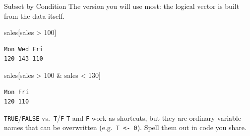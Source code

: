 \documentclass[
  ignorenonframetext,
  aspectratio=169,
]{beamer}
\newenvironment{Shaded}{\begin{snugshade}}{\end{snugshade}}
\newcommand{\DecValTok}[1]{\textcolor[rgb]{0.68,0.00,0.00}{#1}}
\newcommand{\NormalTok}[1]{\textcolor[rgb]{0.00,0.23,0.31}{#1}}
\newcommand{\SpecialCharTok}[1]{\textcolor[rgb]{0.37,0.37,0.37}{#1}}
\begin{document}
\begin{frame}[fragile]{Subset by Condition}
\protect\hypertarget{subset-by-condition}{}
The version you will use most: the logical vector is built from the data
itself.

\begin{Shaded}
\begin{Highlighting}[]
\NormalTok{sales[sales }\SpecialCharTok{\textgreater{}} \DecValTok{100}\NormalTok{]}
\end{Highlighting}
\end{Shaded}

\begin{verbatim}
Mon Wed Fri 
120 143 110 
\end{verbatim}

\begin{Shaded}
\begin{Highlighting}[]
\NormalTok{sales[sales }\SpecialCharTok{\textgreater{}} \DecValTok{100} \SpecialCharTok{\&}\NormalTok{ sales }\SpecialCharTok{\textless{}} \DecValTok{130}\NormalTok{]}
\end{Highlighting}
\end{Shaded}

\begin{verbatim}
Mon Fri 
120 110 
\end{verbatim}

\begin{exampleblock}{\texttt{TRUE}/\texttt{FALSE}
vs.~\texttt{T}/\texttt{F}}
\protect\hypertarget{truefalse-vs.-tf}{}
\texttt{T} and \texttt{F} work as shortcuts, but they are ordinary
variable names that can be overwritten
(e.g.~\texttt{T\ \textless{}-\ 0}). Spell them out in code you share.
\end{exampleblock}
\end{frame}
\end{document}
